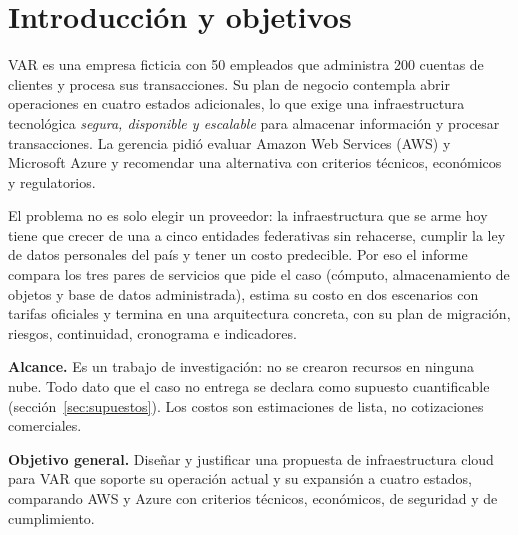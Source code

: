 \documentclass[11pt,letterpaper]{article}
\begin{document}
\setcounter{page}{1}
\fancyfoot[C]{\sffamily\small\thepage}
{\hypersetup{linkcolor=ink}\tableofcontents}
\vspace{0.6em}
{\small\listoffigures}
{\small\listoftables}
\clearpage
{}
\setcounter{page}{1}

\section{Introducción y objetivos}
VAR es una empresa ficticia con 50 empleados que administra 200 cuentas de clientes y procesa sus transacciones. Su plan de negocio contempla abrir operaciones en cuatro estados adicionales, lo que exige una infraestructura tecnológica \emph{segura, disponible y escalable} para almacenar información y procesar transacciones. La gerencia pidió evaluar Amazon Web Services (AWS) y Microsoft Azure y recomendar una alternativa con criterios técnicos, económicos y regulatorios.

El problema no es solo elegir un proveedor: la infraestructura que se arme hoy tiene que crecer de una a cinco entidades federativas sin rehacerse, cumplir la ley de datos personales del país y tener un costo predecible. Por eso el informe compara los tres pares de servicios que pide el caso (cómputo, almacenamiento de objetos y base de datos administrada), estima su costo en dos escenarios con tarifas oficiales y termina en una arquitectura concreta, con su plan de migración, riesgos, continuidad, cronograma e indicadores.

\textbf{Alcance.} Es un trabajo de investigación: no se crearon recursos en ninguna nube. Todo dato que el caso no entrega se declara como supuesto cuantificable (sección~\ref{sec:supuestos}). Los costos son estimaciones de lista, no cotizaciones comerciales.

\textbf{Objetivo general.} Diseñar y justificar una propuesta de infraestructura cloud para VAR que soporte su operación actual y su expansión a cuatro estados, comparando AWS y Azure con criterios técnicos, económicos, de seguridad y de cumplimiento.
\end{document}
